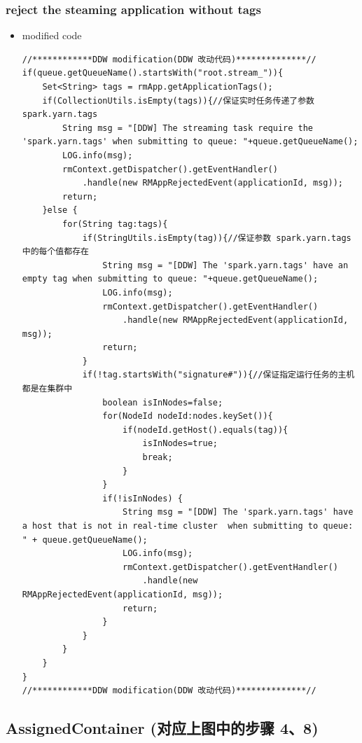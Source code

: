 \documentclass[11pt]{article}
\begin{document}
\subsubsection{reject the steaming application without tags}
\label{sec:org856c9d7}
\begin{itemize}
\item modified code
\begin{verbatim}
//************DDW modification(DDW 改动代码)**************//
if(queue.getQueueName().startsWith("root.stream_")){
    Set<String> tags = rmApp.getApplicationTags();
    if(CollectionUtils.isEmpty(tags)){//保证实时任务传递了参数 spark.yarn.tags
        String msg = "[DDW] The streaming task require the 'spark.yarn.tags' when submitting to queue: "+queue.getQueueName();
        LOG.info(msg);
        rmContext.getDispatcher().getEventHandler()
            .handle(new RMAppRejectedEvent(applicationId, msg));
        return;
    }else {
        for(String tag:tags){
            if(StringUtils.isEmpty(tag)){//保证参数 spark.yarn.tags 中的每个值都存在
                String msg = "[DDW] The 'spark.yarn.tags' have an empty tag when submitting to queue: "+queue.getQueueName();
                LOG.info(msg);
                rmContext.getDispatcher().getEventHandler()
                    .handle(new RMAppRejectedEvent(applicationId, msg));
                return;
            }
            if(!tag.startsWith("signature#")){//保证指定运行任务的主机都是在集群中
                boolean isInNodes=false;
                for(NodeId nodeId:nodes.keySet()){
                    if(nodeId.getHost().equals(tag)){
                        isInNodes=true;
                        break;
                    }
                }
                if(!isInNodes) {
                    String msg = "[DDW] The 'spark.yarn.tags' have a host that is not in real-time cluster  when submitting to queue: " + queue.getQueueName();
                    LOG.info(msg);
                    rmContext.getDispatcher().getEventHandler()
                        .handle(new RMAppRejectedEvent(applicationId, msg));
                    return;
                }
            }
        }
    }
}
//************DDW modification(DDW 改动代码)**************//
\end{verbatim}
\end{itemize}
\subsection{AssignedContainer (对应上图中的步骤 4、8)}
\label{sec:orgcbf8802}
\end{document}
